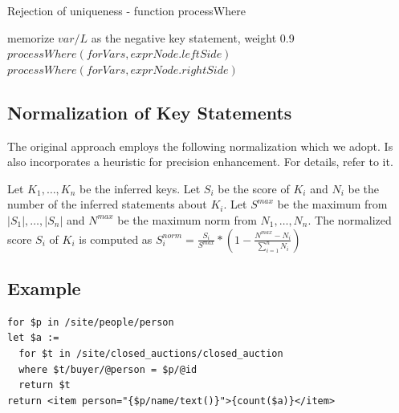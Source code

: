 \begin{algorithm}
\caption{Rejection of uniqueness - function processWhere}
\label{ALG_rejection_of_uniqueness_function_process_where}
\begin{algorithmic}[1]

                \STATE memorize $var/L$ as the negative key statement, weight 0.9
            \ENDIF
        \ENDFOR
        \STATE $processWhere(forVars, exprNode.leftSide)$
        \STATE $processWhere(forVars, exprNode.rightSide)$
    \ENDIF
\ENDIF
\end{algorithmic}
\end{algorithm}

\subsection{Normalization of Key Statements}
The original approach \cite{Necasky:2009:DXK:1529282.1529414} employs the following normalization which we adopt. Is also incorporates a heuristic for precision enhancement. For details, refer to it.

Let $K_1, \dots, K_n$ be the inferred keys. Let $S_i$ be the score of $K_i$ and $N_i$ be the number of the inferred statements about $K_i$. Let $S^{max}$ be the maximum from $|S_1|, \dots , |S_n|$ and $N^{max}$ be the maximum norm
from $N_1, \dots , N_n$. The normalized score $S_i$ of $K_i$ is computed as $S^{norm}_i = \frac{S_i}{S^{max}} * (1 - \frac{N^{max} - N_i}{\sum_{i=1}^{n}N_i})$

\subsection{Example}
\begin{lstlisting}[float, caption=Sample query 2., frame=single, label=listing_sample_query_2]
for $p in /site/people/person
let $a :=
  for $t in /site/closed_auctions/closed_auction
  where $t/buyer/@person = $p/@id
  return $t
return <item person="{$p/name/text()}">{count($a)}</item>
\end{lstlisting}

